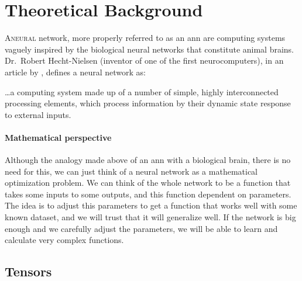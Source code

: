

\chapter{Theoretical Background}\label{cha:theory}


\lettrine{A}{neural} network, more properly referred to as an \gls{ann} are
computing systems vaguely inspired by the biological neural networks that
constitute animal brains. Dr.\ Robert Hecht-Nielsen (inventor of one of the
first neurocomputers), in an article by
, defines a neural network as:

\begin{quoteBox}
  \ldots a computing system made up of a number of simple, highly
  interconnected processing elements, which process information by their
  dynamic state response to external inputs.
  \tcblower{}
\end{quoteBox}

\subsubsection{Mathematical perspective}
Although the analogy made above of an \gls{ann} with a biological brain, there
is no need for this, we can just think of a neural network as a mathematical
optimization problem. We can think of the whole network to be a function that
takes some inputs to some outputs, and this function dependent on
parameters. The idea is to adjust this parameters to get a function that works
well with some known dataset, and we will trust that it will generalize
well. If the network is big enough and we carefully adjust the parameters, we
will be able to learn and calculate very complex functions.


\section{Tensors}

